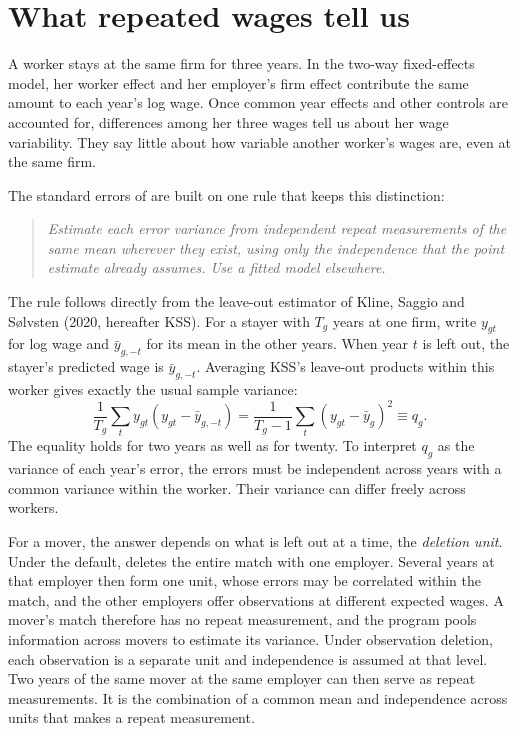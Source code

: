 \section{What repeated wages tell us}\label{sec:setting}

A worker stays at the same firm for three years. In the two-way fixed-effects model, her
worker effect and her employer's firm effect contribute the same amount to each year's
log wage. Once common year effects and other controls are accounted for, differences
among her three wages tell us about her wage variability. They say little about how
variable another worker's wages are, even at the same firm.

The standard errors of \fevc{} are built on one rule that keeps this distinction:
\begin{quote}
\emph{Estimate each error variance from independent repeat measurements of the same mean
wherever they exist, using only the independence that the point estimate already
assumes. Use a fitted model elsewhere.}
\end{quote}

The rule follows directly from the leave-out estimator of Kline, Saggio and
S{\o}lvsten (2020, hereafter KSS). For a stayer with $T_g$ years at one firm, write
$y_{gt}$ for log wage and $\bar y_{g,-t}$ for its mean in the other years. When year
$t$ is left out, the stayer's predicted wage is $\bar y_{g,-t}$. Averaging KSS's
leave-out products within this worker gives exactly the usual sample variance:
\begin{equation}\label{eq:q}
 \frac{1}{T_g}\sum_t y_{gt}(y_{gt}-\bar y_{g,-t})
   =\frac{1}{T_g-1}\sum_t(y_{gt}-\bar y_g)^2
   \equiv q_g .
\end{equation}
The equality holds for two years as well as for twenty. To interpret $q_g$ as the
variance of each year's error, the errors must be independent across years with a
common variance within the worker. Their variance can differ freely across workers.

For a mover, the answer depends on what is left out at a time, the \emph{deletion
unit}. Under the default, \fevc{} deletes the entire match with one employer. Several
years at that employer then form one unit, whose errors may be correlated within the
match, and the other employers offer observations at different expected wages. A mover's
match therefore has no repeat measurement, and the program pools information across
movers to estimate its variance. Under observation deletion, each observation is a
separate unit and independence is assumed at that level. Two years of the same mover at
the same employer can then serve as repeat measurements. It is the combination of a
common mean and independence across units that makes a repeat measurement.

